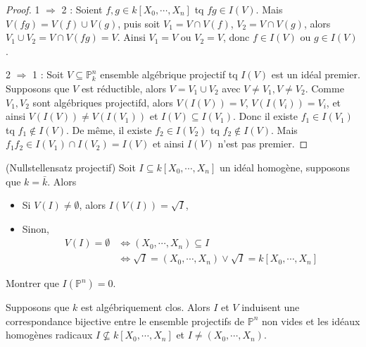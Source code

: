        \begin{proof}
            \item 1 $\Rightarrow$ 2 : Soient $f,g \in k[X_0, \cdots, X_n]$ tq $fg \in I(V)$. Mais $V(fg) = V(f) \cup V(g)$, puis soit $V_1 = V \cap V(f)$, $V_2 = V \cap V(g)$, alors $V_1 \cup V_2 = V \cap V(fg) = V$. Ainsi $V_1 = V$ ou $V_2 = V$, donc $f \in I(V)$ ou $g \in I(V)$.
            \item 2 $\Rightarrow$ 1 : Soit $V \subseteq \mathbb{P}_k^n$ ensemble algébrique projectif tq $I(V)$ est un idéal premier. Supposons que $V$ est réductible, alors $V = V_1 \cup V_2$ avec $V \neq V_1, V \neq V_2$. Comme $V_1,V_2$ sont algébriques projectifd, alors $V(I(V)) = V$, $V(I(V_i)) = V_i$, et ainsi $V(I(V)) \neq V(I(V_1))$ et $I(V) \subseteq I(V_1)$. Donc il existe $f_1 \in I(V_1)$ tq $f_1 \notin I(V)$. De même, il existe $f_2 \in I(V_2)$ tq $f_2 \notin I(V)$. Mais $f_1f_2 \in I(V_1) \cap I(V_2) = I(V)$ et ainsi $I(V)$ n'est pas premier.
        \end{proof}
        \begin{theo} (Nullstellensatz projectif)
            Soit $I \subseteq k[X_0, \cdots, X_n]$ un idéal homogène, supposons que $k = \bar k$. Alors
            \begin{itemize}
                \item Si $V(I) \neq \emptyset$, alors $I(V(I)) = \sqrt{I}$,
                \item Sinon, \begin{align*}
                    V(I) = \emptyset &\iff (X_0, \cdots, X_n) \subseteq I \\
                    &\iff \sqrt{I} = (X_0, \cdots, X_n) \lor \sqrt{I} = k[X_0, \cdots, X_n]
                \end{align*}
            \end{itemize}
        \end{theo}
        \begin{exo}
            Montrer que $I(\mathbb{P}^n) = 0$. 
        \end{exo}
        \begin{coro}
            Supposons que $k$ est algébriquement clos. Alors $I$ et $V$ induisent une correspondance bijective entre le ensemble projectifs de $\mathbb{P}^n$ non vides et les idéaux homogènes radicaux $I \nsubseteq k[X_0, \cdots, X_n]$ et $I \neq (X_0, \cdots, X_n)$.
        \end{coro}

